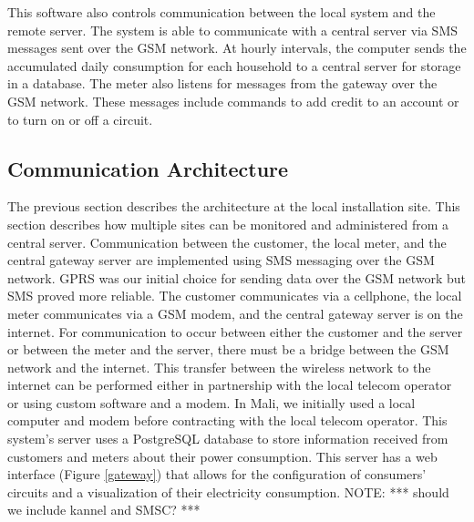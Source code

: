 \documentclass[conference]{IEEEtran}
\newcommand{\note}[1]{{\color{red} NOTE: *** #1 ***}}
\begin{document}
This software also controls communication between the 
local system and the remote server.  
The system is able to communicate with a central server via SMS messages
sent over the GSM network.
At hourly intervals, the computer
sends the accumulated daily consumption for each household to a central 
server for storage in a database.
The meter also listens for messages from the gateway over the GSM network.
These messages
include commands to add credit to an account or to turn on or off a 
circuit.

\subsection{Communication Architecture}
The previous section describes the architecture at the local
installation site.  This section describes how multiple sites can be
monitored and administered from a central server.  Communication
between the customer, the local meter, and the central gateway
server are implemented using SMS messaging over the GSM network.
GPRS was our initial choice for sending data over the GSM network
but SMS proved more reliable.  
The customer communicates via a cellphone, the local meter communicates
via a GSM modem, and the central gateway server is on the 
internet.
For communication to occur between either the customer and the server
or between the meter and the server, there must be a bridge between
the GSM network and the internet.
This transfer between the wireless network to the internet can be performed 
either in partnership with the local
telecom operator or using custom software and a modem.
In Mali, we initially used a local computer and modem before contracting 
with the local telecom operator.
This system's server uses a PostgreSQL database to store information
received from customers and meters about their power consumption.  
This server has
a web interface (Figure \ref{gateway}) that allows for the configuration 
of consumers' circuits and a visualization of their electricity consumption.
\note{should we include kannel and SMSC?}

\end{document}
